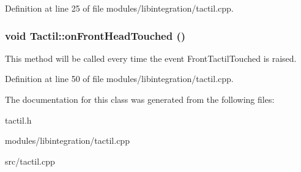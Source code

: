 Definition at line 25 of file modules/libintegration/tactil.cpp.

\hypertarget{class_tactil_a92426208e117a01774b735a0d034c45c}{
\subsubsection[{onFrontHeadTouched}]{\setlength{\rightskip}{0pt plus 5cm}void Tactil::onFrontHeadTouched ()}}
\label{class_tactil_a92426208e117a01774b735a0d034c45c}
This method will be called every time the event FrontTactilTouched is raised. 

Definition at line 50 of file modules/libintegration/tactil.cpp.



The documentation for this class was generated from the following files:\begin{DoxyCompactItemize}
\item 
tactil.h\item 
modules/libintegration/tactil.cpp\item 
src/tactil.cpp\end{DoxyCompactItemize}
